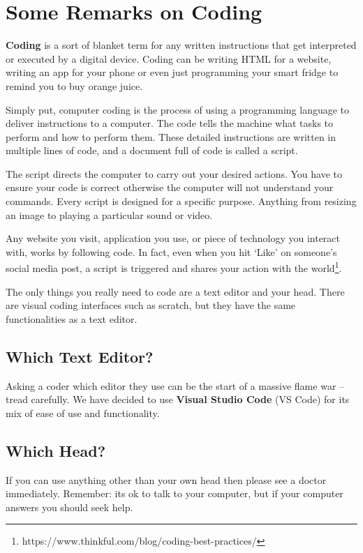 \documentclass[11pt,a4paper]{report}
\newcommand{\bfb}[1]{{\bf \color{blue} #1}}
\begin{document}
\section{Some Remarks on Coding}
\bfb{Coding} is a sort of blanket term for any written instructions that get interpreted or executed by a digital device. Coding can be writing HTML for a website, writing an app for your phone or even just programming your smart fridge to remind you to buy orange juice.

Simply put, computer coding is the process of using a programming language to deliver instructions to a computer. The code tells the machine what tasks to perform and how to perform them. These detailed instructions are written in multiple lines of code, and a document full of code is called a script.

The script directs the computer to carry out your desired actions. You have to ensure your code is correct otherwise the computer will not understand your commands. Every script is designed for a specific purpose. Anything from resizing an image to playing a particular sound or video.

Any website you visit, application you use, or piece of technology you interact with, works by following code. In fact, even when you hit ‘Like’ on someone’s social media post, a script is triggered and shares your action with the world\footnote{https://www.thinkful.com/blog/coding-best-practices/}.

The only things you really need to code are a text editor and your head. There are visual coding interfaces such as scratch, but they have the same functionalities as a text editor.

\subsection{Which Text Editor?}

Asking a coder which editor they use can be the start of a massive flame war -- tread carefully.  We have decided to use \bfb{Visual Studio Code} (VS Code) for its mix of ease of use and functionality. 

\subsection{Which Head?}

If you can use anything other than your own head then please see a doctor immediately. Remember: its ok to talk to your computer, but if your computer answers you should seek help.
\end{document}
